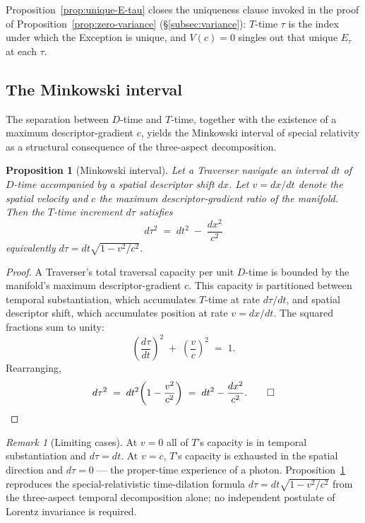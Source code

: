 \documentclass[11pt,a4paper]{article}
\newtheorem{proposition}[theorem]{Proposition}
\theoremstyle{definition}
\theoremstyle{remark}
\newtheorem{remark}[theorem]{Remark}
\begin{document}
Proposition~\ref{prop:unique-E-tau} closes the uniqueness clause invoked in the proof of Proposition~\ref{prop:zero-variance} (\S\ref{subsec:variance}): $T$-time $\tau$ is the index under which the Exception is unique, and $V(c) = 0$ singles out that unique $E_{\tau}$ at each $\tau$.

\subsection{The Minkowski interval}\label{subsec:minkowski}

The separation between $D$-time and $T$-time, together with the existence of a maximum descriptor-gradient $c$, yields the Minkowski interval of special relativity as a structural consequence of the three-aspect decomposition.

\begin{proposition}[Minkowski interval]\label{prop:minkowski}
Let a Traverser navigate an interval $dt$ of $D$-time accompanied by a spatial descriptor shift $dx$. Let $v = dx/dt$ denote the spatial velocity and $c$ the maximum descriptor-gradient ratio of the manifold. Then the $T$-time increment $d\tau$ satisfies
\[
\boxed{\;d\tau^{2} \;=\; dt^{2} \;-\; \frac{dx^{2}}{c^{2}}\;}
\]
equivalently $d\tau = dt\sqrt{1 - v^{2}/c^{2}}$.
\end{proposition}

\begin{proof}
A Traverser's total traversal capacity per unit $D$-time is bounded by the manifold's maximum descriptor-gradient $c$. This capacity is partitioned between temporal substantiation, which accumulates $T$-time at rate $d\tau/dt$, and spatial descriptor shift, which accumulates position at rate $v = dx/dt$. The squared fractions sum to unity:
\[
\left(\frac{d\tau}{dt}\right)^{\!2} \;+\; \left(\frac{v}{c}\right)^{\!2} \;=\; 1.
\]
Rearranging,
\[
d\tau^{2} \;=\; dt^{2}\!\left(1 - \frac{v^{2}}{c^{2}}\right) \;=\; dt^{2} - \frac{dx^{2}}{c^{2}}. \qed
\]
\end{proof}

\begin{remark}[Limiting cases]\label{rem:minkowski-limits}
At $v=0$ all of $T$'s capacity is in temporal substantiation and $d\tau = dt$. At $v=c$, $T$'s capacity is exhausted in the spatial direction and $d\tau = 0$ --- the proper-time experience of a photon. Proposition~\ref{prop:minkowski} reproduces the special-relativistic time-dilation formula $d\tau = dt\sqrt{1 - v^{2}/c^{2}}$ from the three-aspect temporal decomposition alone; no independent postulate of Lorentz invariance is required.
\end{remark}
\end{document}
